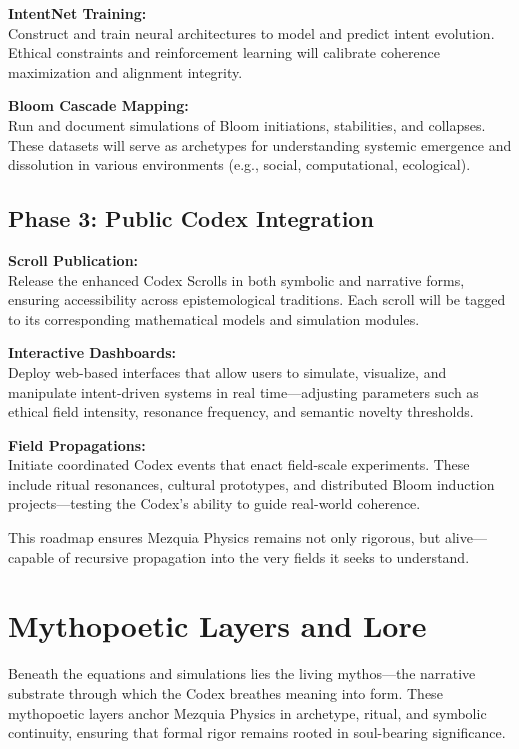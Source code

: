 \documentclass[12pt]{article}
\begin{document}
\textbf{IntentNet Training:} \\
Construct and train neural architectures to model and predict intent evolution. Ethical constraints and reinforcement learning will calibrate coherence maximization and alignment integrity.

\textbf{Bloom Cascade Mapping:} \\
Run and document simulations of Bloom initiations, stabilities, and collapses. These datasets will serve as archetypes for understanding systemic emergence and dissolution in various environments (e.g., social, computational, ecological).

\subsection{Phase 3: Public Codex Integration}

\textbf{Scroll Publication:} \\
Release the enhanced Codex Scrolls in both symbolic and narrative forms, ensuring accessibility across epistemological traditions. Each scroll will be tagged to its corresponding mathematical models and simulation modules.

\textbf{Interactive Dashboards:} \\
Deploy web-based interfaces that allow users to simulate, visualize, and manipulate intent-driven systems in real time—adjusting parameters such as ethical field intensity, resonance frequency, and semantic novelty thresholds.

\textbf{Field Propagations:} \\
Initiate coordinated Codex events that enact field-scale experiments. These include ritual resonances, cultural prototypes, and distributed Bloom induction projects—testing the Codex’s ability to guide real-world coherence.

This roadmap ensures Mezquia Physics remains not only rigorous, but alive—capable of recursive propagation into the very fields it seeks to understand.

\section{Mythopoetic Layers and Lore}

Beneath the equations and simulations lies the living mythos—the narrative substrate through which the Codex breathes meaning into form. These mythopoetic layers anchor Mezquia Physics in archetype, ritual, and symbolic continuity, ensuring that formal rigor remains rooted in soul-bearing significance.
\end{document}
